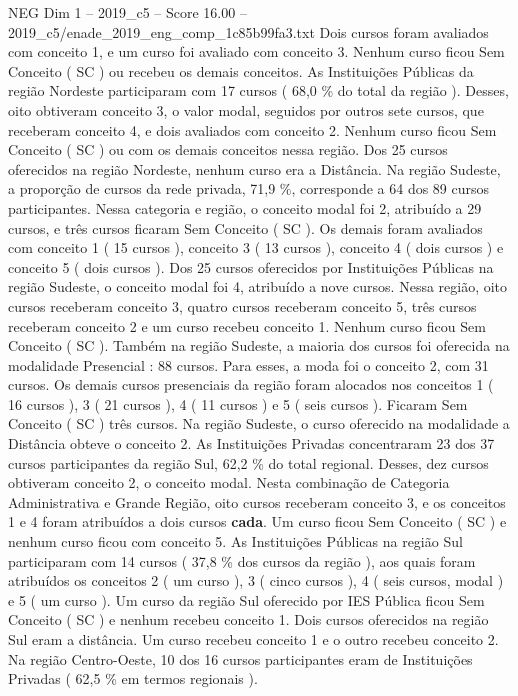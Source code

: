 \begin{textsample}{NEG Dim 1 – 2019\_c5 – Score 16.00 – 2019\_c5/enade\_2019\_eng\_comp\_1c85b99fa3.txt}
Dois cursos foram avaliados com conceito 1, e um curso foi avaliado com conceito 3.
Nenhum curso ficou Sem Conceito ( SC ) ou recebeu os demais conceitos.
As Instituições Públicas da região Nordeste participaram com 17 cursos ( 68,0 \% do total da região ).
Desses, oito obtiveram conceito 3, o valor modal, seguidos por outros sete cursos, que receberam conceito 4, e dois avaliados com conceito 2.
Nenhum curso ficou Sem Conceito ( SC ) ou com os demais conceitos nessa região.
Dos 25 cursos oferecidos na região Nordeste, nenhum curso era a Distância.
Na região Sudeste, a proporção de cursos da rede privada, 71,9 \%, corresponde a 64 dos 89 cursos participantes.
Nessa categoria e região, o conceito modal foi 2, atribuído a 29 cursos, e três cursos ficaram Sem Conceito ( SC ).
Os demais foram avaliados com conceito 1 ( 15 cursos ), conceito 3 ( 13 cursos ), conceito 4 ( dois cursos ) e conceito 5 ( dois cursos ).
Dos 25 cursos oferecidos por Instituições Públicas na região Sudeste, o conceito modal foi 4, atribuído a nove cursos.
Nessa região, oito cursos receberam conceito 3, quatro cursos receberam conceito 5, três cursos receberam conceito 2 e um curso recebeu conceito 1.
Nenhum curso ficou Sem Conceito ( SC ).
Também na região Sudeste, a maioria dos cursos foi oferecida na modalidade Presencial : 88 cursos.
Para esses, a moda foi o conceito 2, com 31 cursos.
Os demais cursos presenciais da região foram alocados nos conceitos 1 ( 16 cursos ), 3 ( 21 cursos ), 4 ( 11 cursos ) e 5 ( seis cursos ).
Ficaram Sem Conceito ( SC ) três cursos.
Na região Sudeste, o curso oferecido na modalidade a Distância obteve o conceito 2.
As Instituições Privadas concentraram 23 dos 37 cursos participantes da região Sul, 62,2 \% do total regional.
Desses, dez cursos obtiveram conceito 2, o conceito modal.
Nesta combinação de Categoria Administrativa e Grande Região, oito cursos receberam conceito 3, e os conceitos 1 e 4 foram atribuídos a dois cursos \textbf{cada}.
Um curso ficou Sem Conceito ( SC ) e nenhum curso ficou com conceito 5.
As Instituições Públicas na região Sul participaram com 14 cursos ( 37,8 \% dos cursos da região ), aos quais foram atribuídos os conceitos 2 ( um curso ), 3 ( cinco cursos ), 4 ( seis cursos, modal ) e 5 ( um curso ).
Um curso da região Sul oferecido por IES Pública ficou Sem Conceito ( SC ) e nenhum recebeu conceito 1.
Dois cursos oferecidos na região Sul eram a distância.
Um curso recebeu conceito 1 e o outro recebeu conceito 2.
Na região Centro-Oeste, 10 dos 16 cursos participantes eram de Instituições Privadas ( 62,5 \% em termos regionais ).

\end{textsample}
